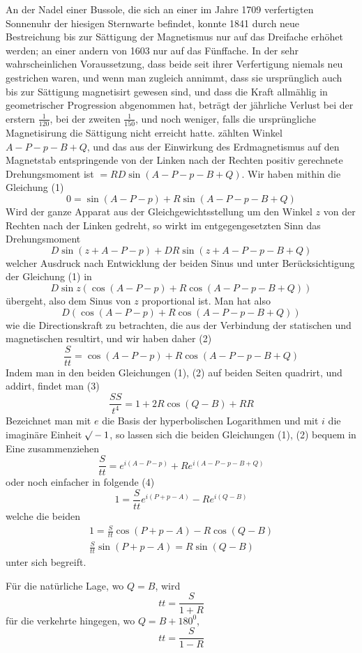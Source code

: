 \expandafter\def\csname HistoricalNoteText416\endcsname{An der Nadel einer Bussole, die sich an einer im Jahre 1709 verfertigten Sonnenuhr der hiesigen Sternwarte befindet, konnte 1841 durch neue Bestreichung bis zur Sättigung der Magnetismus nur auf das Dreifache erhöhet werden; an einer andern von 1603 nur auf das Fünffache. In der sehr wahrscheinlichen Voraussetzung, dass beide seit ihrer Verfertigung niemals neu gestrichen waren, und wenn man zugleich annimmt, dass sie ursprünglich auch bis zur Sättigung magnetisirt gewesen sind, und dass die Kraft allmählig in geometrischer Progression abgenommen hat, beträgt der jährliche Verlust bei der erstern $\frac{1}{120}$, bei der zweiten $\frac{1}{150}$, und noch weniger, falls die ursprüngliche Magnetisirung die Sättigung nicht erreicht hatte.}%
zählten Winkel $A-P-p-B+Q$, und das aus der Einwirkung des Erdmagnetismus auf den Magnetstab entspringende von der Linken nach der Rechten positiv gerechnete Drehungsmoment ist $=RD\sin(A-P-p-B+Q)$. Wir haben mithin die Gleichung (1)
\[
0=\sin(A-P-p)+R\sin(A-P-p-B+Q)
\]
Wird der ganze Apparat aus der Gleichgewichtsstellung um den Winkel $z$ von der Rechten nach der Linken gedreht, so wirkt im entgegengesetzten Sinn das Drehungsmoment
\[
D\sin(z+A-P-p)+DR\sin(z+A-P-p-B+Q)
\]
welcher Ausdruck nach Entwicklung der beiden Sinus und unter Berücksichtigung der Gleichung (1) in
\[
D\sin z(\cos(A-P-p)+R\cos(A-P-p-B+Q))
\]
übergeht, also dem Sinus von $z$ proportional ist. Man hat also
\[
D(\cos(A-P-p)+R\cos(A-P-p-B+Q))
\]
wie die Directionskraft zu betrachten, die aus der Verbindung der statischen und magnetischen resultirt, und wir haben daher (2)
\[
\frac{S}{tt}=\cos(A-P-p)+R\cos(A-P-p-B+Q)
\]
Indem man in den beiden Gleichungen (1), (2) auf beiden Seiten quadrirt, und addirt, findet man (3)
\[
\frac{SS}{t^4}=1+2R\cos(Q-B)+RR
\]
Bezeichnet man mit $e$ die Basis der hyperbolischen Logarithmen und mit $i$ die imaginäre Einheit $\mathord{{}^{}\!\surd}-1$, so lassen sich die beiden Gleichungen (1), (2) bequem in Eine zusammenziehen
\[
\frac{S}{tt}=e^{i(A-P-p)}+Re^{i(A-P-p-B+Q)}
\]
oder noch einfacher in folgende (4)
\[
1=\frac{S}{tt}e^{i(P+p-A)}-Re^{i(Q-B)}
\]
welche die beiden
\[
\begin{gathered}
1=\frac{S}{tt}\cos(P+p-A)-R\cos(Q-B)\\
\frac{S}{tt}\sin(P+p-A)=R\sin(Q-B)
\end{gathered}
\]
unter sich begreift.

Für die natürliche Lage, wo $Q=B$, wird
\[
tt=\frac{S}{1+R}
\]
für die verkehrte hingegen, wo $Q=B+180^0$,
\[
tt=\frac{S}{1-R}
\]

